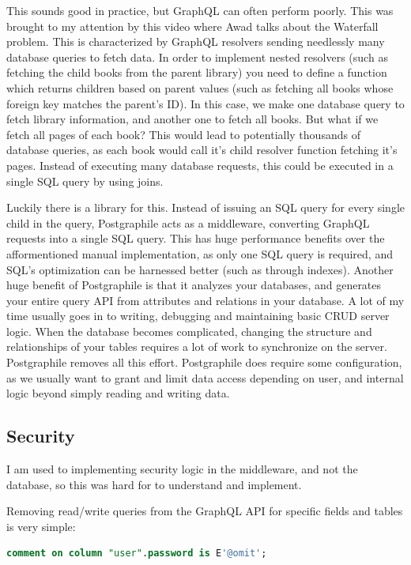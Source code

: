 \documentclass{l4proj}
\begin{document}
This sounds good in practice, but GraphQL can often perform poorly. This was brought to my attention by this video where Awad talks about the Waterfall problem. This is characterized by GraphQL resolvers sending needlessly many database queries to fetch data. In order to implement nested resolvers (such as fetching the child books from the parent library) you need to define a function which returns children based on parent values (such as fetching all books whose foreign key matches the parent's ID). In this case, we make one database query to fetch library information, and another one to fetch all books. But what if we fetch all pages of each book? This would lead to potentially thousands of database queries, as each book would call it's child resolver function fetching it's pages. Instead of executing many database requests, this could be executed in a single SQL query by using joins.

Luckily there is a library for this. Instead of issuing an SQL query for every single child in the query, Postgraphile acts as a middleware, converting GraphQL requests into a single SQL query. This has huge performance benefits over the afformentioned manual implementation, as only one SQL query is required, and SQL's optimization can be harnessed better (such as through indexes). Another huge benefit of Postgraphile is that it analyzes your databases, and generates your entire query API from attributes and relations in your database. A lot of my time usually goes in to writing, debugging and maintaining basic CRUD server logic. When the database becomes complicated, changing the structure and relationships of your tables requires a lot of work to synchronize on the server. Postgraphile removes all this effort. Postgraphile does require some configuration, as we usually want to grant and limit data access depending on user, and internal logic beyond simply reading and writing data. 


\subsection{Security}
I am used to implementing security logic in the middleware, and not the database, so this was hard for to understand and implement. 

Removing read/write queries from the GraphQL API for specific fields and tables is very simple:

\begin{lstlisting}[language=SQL, caption={This comment tells Postgraphile to omit password fields} ]
comment on column "user".password is E'@omit';
\end{lstlisting}
\end{document}
